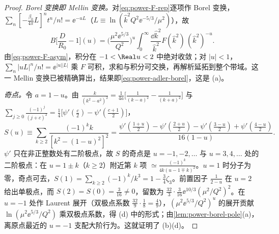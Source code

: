 \begin{proof}
\emph{Borel 变换即 Mellin 变换。}对\eqref{eq:power-F-rep}逐项作 Borel 变换，$\sum_n[-\frac{\beta_0}{4\pi}L]^nt^n/n!=\ee^{-uL}$（$L\equiv\ln(\hat k^2Q^2\ee^{-5/3}/\mu^2)$），故
\begin{equation}\label{eq:power-mellin}
B\Big[\frac{D}{R_0}-1\Big](u)=\Big(\frac{\mu^2\ee^{5/3}}{Q^2}\Big)^u\int_0^\infty\frac{\dd\hat k^2}{\hat k^2}F(\hat k^2)\,(\hat k^2)^{-u}.
\end{equation}
由\eqref{eq:power-F-asym}，积分在 $-1<\Real u<2$ 中绝对收敛；对 $|u|<1$，$\sum_n|uL|^n/n!=\ee^{|u||L|}$ 乘 $F$ 可积，求和与积分可交换，再解析延拓到整个带域。这一 Mellin 变换已被精确算出，结果即\eqref{eq:power-adler-borel}\cite{Beneke1993,Broadhurst1993,Beneke1999}，这是 (a)。

\emph{奇点。}令 $a=1-u$。由 $\frac{k}{(k^2-a^2)^2}=\frac1{4a}\big[\frac{1}{(k-a)^2}-\frac{1}{(k+a)^2}\big]$ 与 $\sum_{j\ge0}\frac{(-1)^j}{(j+c)^2}=\frac14\big[\psi'(\frac c2)-\psi'(\frac{c+1}2)\big]$，
\begin{equation}\label{eq:power-S-trigamma}
S(u)\equiv\sum_{k\ge2}\frac{(-1)^kk}{[k^2-(1-u)^2]^2}=\frac{\psi'(\frac{1+u}2)-\psi'(\frac{2+u}2)-\psi'(\frac{3-u}2)+\psi'(\frac{4-u}2)}{16(1-u)}.
\end{equation}
$\psi'$ 只在非正整数处有二阶极点，故 $S$ 的奇点是 $u=-1,-2,\dots$ 与 $u=3,4,\dots$ 处的二阶极点：在 $u=1\pm k$（$k\ge2$）附近第 $k$ 项 $\simeq\frac{(-1)^k}{4k(u-1\mp k)^2}$。$u=1$ 时分子为零，奇点可去，$S(1)=\sum_{k\ge2}(-1)^k/k^3=1-\frac34\zeta_3$。前置因子 $\frac{1}{2-u}$ 在 $u=2$ 给出单极点，而 $S(2)=S(0)=\frac3{16}\ne0$，留数为 $\frac{32}{3}\cdot\frac{3}{16}\ee^{10/3}(\mu^2/Q^2)^2$。在 $u=-1$ 处作 Laurent 展开（双极点系数 $\frac{32}{9}\cdot\frac18=\frac49$），$(\mu^2\ee^{5/3}/Q^2)^u$ 的展开贡献 $\ln(\mu^2\ee^{5/3}/Q^2)$ 乘双极点系数，得 (d) 中的形式；由\cref{lem:power-borel-pole}(a)，离原点最近的 $u=-1$ 支配大阶行为。这就证明了 (b)(d)。


\end{proof}
